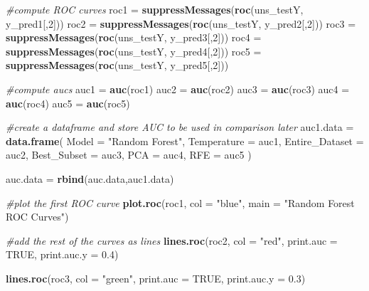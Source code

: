 \documentclass[
]{article}
\newenvironment{Shaded}{\begin{snugshade}}{\end{snugshade}}
\newcommand{\AttributeTok}[1]{\textcolor[rgb]{0.13,0.29,0.53}{#1}}
\newcommand{\CommentTok}[1]{\textcolor[rgb]{0.56,0.35,0.01}{\textit{#1}}}
\newcommand{\ConstantTok}[1]{\textcolor[rgb]{0.56,0.35,0.01}{#1}}
\newcommand{\DecValTok}[1]{\textcolor[rgb]{0.00,0.00,0.81}{#1}}
\newcommand{\FloatTok}[1]{\textcolor[rgb]{0.00,0.00,0.81}{#1}}
\newcommand{\FunctionTok}[1]{\textcolor[rgb]{0.13,0.29,0.53}{\textbf{#1}}}
\newcommand{\NormalTok}[1]{#1}
\newcommand{\OtherTok}[1]{\textcolor[rgb]{0.56,0.35,0.01}{#1}}
\newcommand{\StringTok}[1]{\textcolor[rgb]{0.31,0.60,0.02}{#1}}
\begin{document}
\begin{Shaded}
\begin{Highlighting}[]
\CommentTok{\#compute ROC curves}
\NormalTok{roc1 }\OtherTok{=} \FunctionTok{suppressMessages}\NormalTok{(}\FunctionTok{roc}\NormalTok{(uns\_testY, y\_pred1[,}\DecValTok{2}\NormalTok{]))}
\NormalTok{roc2 }\OtherTok{=} \FunctionTok{suppressMessages}\NormalTok{(}\FunctionTok{roc}\NormalTok{(uns\_testY, y\_pred2[,}\DecValTok{2}\NormalTok{]))}
\NormalTok{roc3 }\OtherTok{=} \FunctionTok{suppressMessages}\NormalTok{(}\FunctionTok{roc}\NormalTok{(uns\_testY, y\_pred3[,}\DecValTok{2}\NormalTok{]))}
\NormalTok{roc4 }\OtherTok{=} \FunctionTok{suppressMessages}\NormalTok{(}\FunctionTok{roc}\NormalTok{(uns\_testY, y\_pred4[,}\DecValTok{2}\NormalTok{]))}
\NormalTok{roc5 }\OtherTok{=} \FunctionTok{suppressMessages}\NormalTok{(}\FunctionTok{roc}\NormalTok{(uns\_testY, y\_pred5[,}\DecValTok{2}\NormalTok{]))}

\CommentTok{\#compute aucs}
\NormalTok{auc1 }\OtherTok{=} \FunctionTok{auc}\NormalTok{(roc1)}
\NormalTok{auc2 }\OtherTok{=} \FunctionTok{auc}\NormalTok{(roc2)}
\NormalTok{auc3 }\OtherTok{=} \FunctionTok{auc}\NormalTok{(roc3)}
\NormalTok{auc4 }\OtherTok{=} \FunctionTok{auc}\NormalTok{(roc4)}
\NormalTok{auc5 }\OtherTok{=} \FunctionTok{auc}\NormalTok{(roc5)}

\CommentTok{\#create a dataframe and store AUC to be used in comparison later}
\NormalTok{auc1.data }\OtherTok{=} \FunctionTok{data.frame}\NormalTok{(}
  \AttributeTok{Model =} \StringTok{"Random Forest"}\NormalTok{,}
  \AttributeTok{Temperature =}\NormalTok{ auc1,}
  \AttributeTok{Entire\_Dataset =}\NormalTok{ auc2,}
  \AttributeTok{Best\_Subset =}\NormalTok{ auc3,}
  \AttributeTok{PCA =}\NormalTok{ auc4,}
  \AttributeTok{RFE =}\NormalTok{ auc5}
\NormalTok{)}

\NormalTok{auc.data }\OtherTok{=} \FunctionTok{rbind}\NormalTok{(auc.data,auc1.data)}

\CommentTok{\#plot the first ROC curve}
\FunctionTok{plot.roc}\NormalTok{(roc1, }\AttributeTok{col =} \StringTok{"blue"}\NormalTok{, }\AttributeTok{main =} \StringTok{"Random Forest ROC Curves"}\NormalTok{)}

\CommentTok{\#add the rest of the curves as lines}
\FunctionTok{lines.roc}\NormalTok{(roc2, }\AttributeTok{col =} \StringTok{"red"}\NormalTok{, }\AttributeTok{print.auc =} \ConstantTok{TRUE}\NormalTok{, }\AttributeTok{print.auc.y =} \FloatTok{0.4}\NormalTok{)}

\FunctionTok{lines.roc}\NormalTok{(roc3, }\AttributeTok{col =} \StringTok{"green"}\NormalTok{, }\AttributeTok{print.auc =} \ConstantTok{TRUE}\NormalTok{, }\AttributeTok{print.auc.y =} \FloatTok{0.3}\NormalTok{)}


\end{Highlighting}
\end{Shaded}
\end{document}
